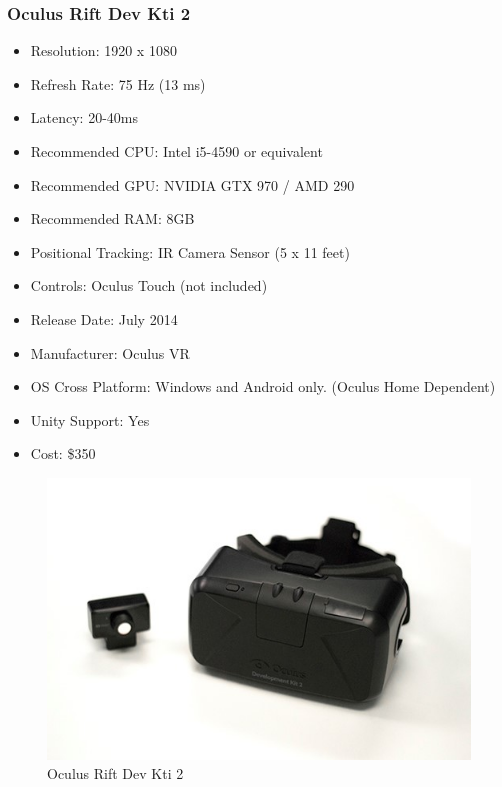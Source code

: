 \documentclass[a4paper,10pt,twoside]{article}
\begin{document}
\subsubsection{Oculus Rift Dev Kti 2}
\begin{itemize}
	\item Resolution: 1920 x 1080
	\item Refresh Rate: 75 Hz (13 ms)
	\item Latency: 20-40ms
	\item Recommended CPU: Intel i5-4590 or equivalent
	\item Recommended GPU: NVIDIA GTX 970 / AMD 290 
	\item Recommended RAM: 8GB
	\item Positional Tracking: IR Camera Sensor (5 x 11 feet)
	\item Controls: Oculus Touch (not included)
	\item Release Date: July 2014
	\item Manufacturer: Oculus VR
	\item OS Cross Platform: Windows and Android only. (Oculus Home Dependent)
	\item Unity Support: Yes
	\item Cost: \$350
\end{itemize}
\begin{figure}[H]
	\includegraphics[width=\linewidth,height=\paperheight,keepaspectratio]{dk2.jpg}
	\caption{Oculus Rift Dev Kti 2}
	\label{fig:Riftdk2Img}
	\end{figure}
	\pagebreak
\end{document}
